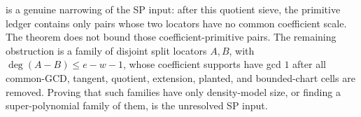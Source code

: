 \begin{remark}
\label{rem:sp-next-remaining-obstruction}
 is a genuine narrowing of the SP
input: after this quotient sieve, the primitive ledger contains only pairs
whose two locators have no common coefficient scale.  The theorem does not
bound those coefficient-primitive pairs.  The remaining obstruction is a
family of disjoint split locators \(A,B\), with
\(\deg(A-B)\le e-w-1\), whose coefficient supports have gcd \(1\) after all
common-GCD, tangent, quotient, extension, planted, and bounded-chart cells are
removed.  Proving that such families have only density-model size, or finding
a super-polynomial family of them, is the unresolved SP input.
\end{remark}
